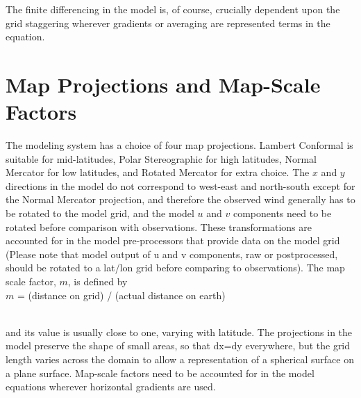 The finite differencing in the model is, of course, crucially dependent upon the
grid staggering wherever gradients or averaging are represented terms in the
equation.

\section{Map Projections and Map-Scale Factors}
The modeling system has a
choice of four map projections. Lambert Conformal is suitable for mid-latitudes,
Polar Stereographic for high latitudes, Normal Mercator for low latitudes, and
Rotated Mercator for extra choice. The $x$ and $y$ directions in the model do
not correspond to west-east and north-south except for the Normal Mercator
projection, and therefore the observed wind generally has to be rotated to the
model grid, and the model $u$ and $v$ components need to be rotated before
comparison with observations. These transformations are accounted for in the
model pre-processors that provide data on the model grid (Please note that
model output of u and v components, raw or postprocessed, should be rotated to a
lat/lon grid before comparing to observations).  The map scale factor, $m$, is
defined by \\

$m$ = (distance on grid) / (actual distance on earth)

\noindent \\ and its value is usually close to one, varying with latitude. The
projections in the model preserve the shape of small areas, so that dx=dy
everywhere, but the grid length varies across the domain to allow a
representation of a spherical surface on a plane surface. Map-scale factors need
to be accounted for in the model equations wherever horizontal gradients are
used.

